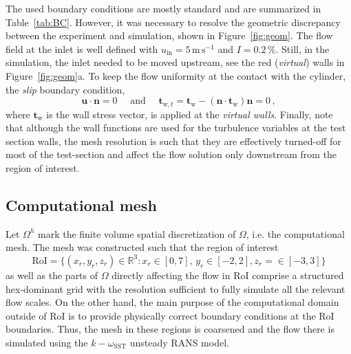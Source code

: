 The used boundary conditions are mostly standard and are summarized in Table~\ref{tab:BC}. However, it was necessary to resolve the geometric discrepancy between the experiment and simulation, shown in Figure~\ref{fig:geom}. The flow field at the inlet is well defined with $u_{\mathrm{in}} = 5\,\mathrm{m\,s^{-1}}$ and $I =  0.2\,\%$. Still, in the simulation, the inlet needed to be moved upstream, see the red (\textit{virtual}) walls in Figure~\ref{fig:geom}a. To keep the flow uniformity at the contact with the cylinder, the \textit{slip} boundary condition,
\begin{equation}
\label{eq:slipBC}
    \bm{u}\cdot \bm{n} = 0\quad \text{ and }\quad \bm{t}_{\mathrm{w},t} = \bm{t}_{\mathrm{w}} - \left(\bm{n}\cdot \bm{t}_{\mathrm{w}} \right)\bm{n} = 0\,,
\end{equation}
where $\bm{t}_{\mathrm{w}}$ is the wall stress vector, is applied at the \textit{virtual walls}. Finally, note that although the wall functions are used for the turbulence variables at the test section walls, the mesh resolution is such that they are effectively turned-off for most of the test-section and affect the flow solution only downstream from the region of interest.

\subsection{Computational mesh}
\label{sub:meshAndBC}
Let $\Omega^{h}$ mark the finite volume spatial discretization of $\Omega$, i.e. the computational mesh. The mesh was constructed such that the region of interest
\begin{equation}
    \label{eq:RoI}
    {\mathrm{RoI} = \{(x_r,y_r,z_r)\in\mathbb{R}^{3}:x_r\in [0,7],\,y_r\in[-2,2],z_r=\in[-3,3]\}}
\end{equation}
as well as the parts of $\Omega$ directly affecting the flow in RoI comprise a structured hex-dominant grid with the resolution sufficient to fully simulate all the relevant flow scales. On the other hand, the main purpose of the computational domain outside of RoI is to provide physically correct boundary conditions at the RoI boundaries. Thus, the mesh in these regions is coarsened and the flow there is simulated using the $k-\omega_{\mathrm{SST}}$ unsteady RANS model.

